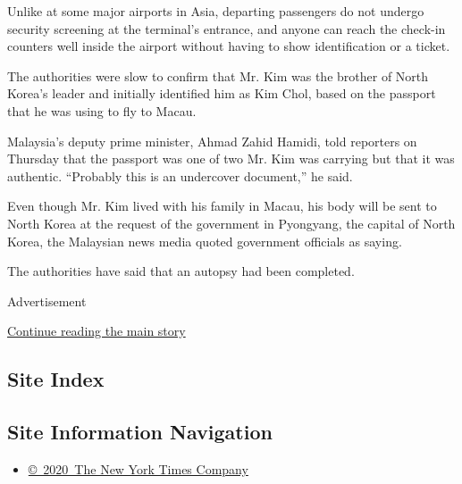 Unlike at some major airports in Asia, departing passengers do not
undergo security screening at the terminal's entrance, and anyone can
reach the check-in counters well inside the airport without having to
show identification or a ticket.

The authorities were slow to confirm that Mr. Kim was the brother of
North Korea's leader and initially identified him as Kim Chol, based on
the passport that he was using to fly to Macau.

Malaysia's deputy prime minister, Ahmad Zahid Hamidi, told reporters on
Thursday that the passport was one of two Mr. Kim was carrying but that
it was authentic. ``Probably this is an undercover document,'' he said.

Even though Mr. Kim lived with his family in Macau, his body will be
sent to North Korea at the request of the government in Pyongyang, the
capital of North Korea, the Malaysian news media quoted government
officials as saying.

The authorities have said that an autopsy had been completed.

Advertisement

\protect\hyperlink{after-bottom}{Continue reading the main story}

\hypertarget{site-index}{%
\subsection{Site Index}\label{site-index}}

\hypertarget{site-information-navigation}{%
\subsection{Site Information
Navigation}\label{site-information-navigation}}

\begin{itemize}
\tightlist
\item
  \href{https://help.nytimes3xbfgragh.onion/hc/en-us/articles/115014792127-Copyright-notice}{©~2020~The
  New York Times Company}
\end{itemize}

